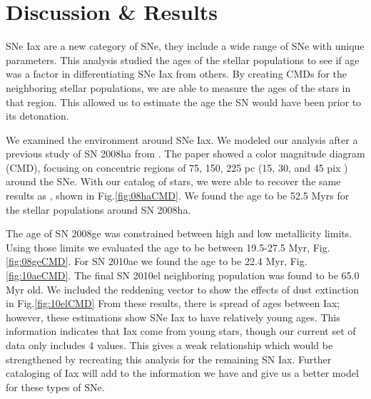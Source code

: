 \documentclass[preprint]{aastex}
\begin{document}
\section{Discussion \& Results}




SNe Iax are a new category of SNe, they include a wide range of SNe with unique parameters.
This analysis studied the ages of the stellar populations to see if age was 
a factor in differentiating SNe Iax from others. 
By creating CMDs for the neighboring stellar populations,
we are able to measure the ages of the stars in that region. 
This allowed us to estimate the age the SN would have been prior to its detonation. 

We examined the environment around SNe Iax. 
We modeled our analysis after a previous study of SN 2008ha from \citet{fol1409}. 
The \citet{fol1409} paper showed a color magnitude diagram (CMD), focusing on 
concentric regions of 75, 150, 225 pc (15, 30, and 45 pix ) around the SNe. 
With our catalog of stars, we were able to recover the same
results as \citet{fol1409}, shown in Fig.\ref{fig:08haCMD}.
We found the age to be 52.5 Myrs for the 
stellar populations around SN 2008ha. 

The age of SN 2008ge was constrained between high and low metallicity limits. 
Using those limits we evaluated the age to be between 19.5-27.5 Myr, Fig.\ref{fig:08geCMD}.
For SN 2010ae we found the age to be 22.4 Myr, Fig.\ref{fig:10aeCMD}. 
The final SN 2010el neighboring population was found to be 65.0 Myr old. 
We included the reddening vector to show the effects of dust extinction in Fig.\ref{fig:10elCMD}
From these results, there is spread of ages between Iax;
however, these estimations show SNe Iax to have relatively young ages. 
This information indicates that Iax come from young stars, though
our current set of data only includes 4 values. 
This gives a weak relationship which would be strengthened by recreating this analysis for the remaining SN Iax.
Further cataloging of Iax will add to the information we have and give us a better model for these types of SNe.
  
\end{document}
